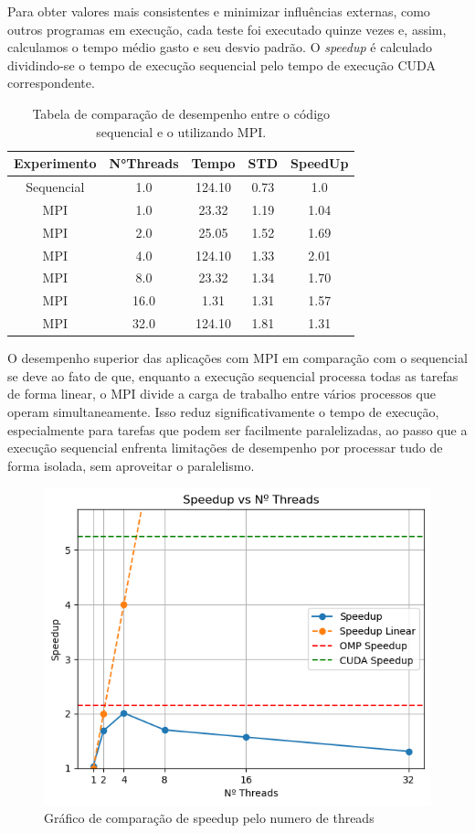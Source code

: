 \documentclass[12pt]{article}
\begin{document}
Para obter valores mais consistentes e minimizar influências externas, como
outros programas em execução, cada teste foi executado quinze vezes e, assim,
calculamos o tempo médio gasto e seu desvio padrão. O \textit{speedup} é
calculado dividindo-se o tempo de execução sequencial pelo tempo de execução
CUDA correspondente.

\begin{table}[ht]
  \centering
  \caption{Tabela de comparação de desempenho entre o código sequencial e o
    utilizando MPI.}
  \vspace{0.3cm}
  \begin{tabular}{||c c c c c||}
    \hline
    Experimento &  N°Threads          & Tempo & STD & SpeedUp \\ [0.5ex]
    \hline\hline
    Sequencial         & 1.0 & 124.10    & 0.73 & 1.0     \\
    \hline
    MPI          & 1.0  & 23.32  & 1.19 & 1.04   \\
    \hline
    MPI          & 2.0  & 25.05   & 1.52 & 1.69  \\
    \hline
    MPI         & 4.0 & 124.10    & 1.33 & 2.01     \\
    \hline
    MPI        & 8.0  & 23.32  & 1.34  & 1.70  \\
    \hline
    MPI         & 16.0  & 1.31  & 1.31 & 1.57  \\
    \hline
    MPI       & 32.0 & 124.10    & 1.81 & 1.31    \\
    \hline    
  \end{tabular}
\end{table}

O desempenho superior das aplicações com MPI em comparação com o sequencial se deve ao fato de que, enquanto a execução sequencial processa todas as tarefas de forma linear, o MPI divide a carga de trabalho entre vários processos que operam simultaneamente. Isso reduz significativamente o tempo de execução, especialmente para tarefas que podem ser facilmente paralelizadas, ao passo que a execução sequencial enfrenta limitações de desempenho por processar tudo de forma isolada, sem aproveitar o paralelismo.

\begin{figure}[H]
  \centering
  \includegraphics[width=.40\textwidth]{docs/figs/speedupxthreads- MPI.png}
  \caption{Gráfico de comparação de speedup pelo numero de threads}
  \label{fig:boxplot_cuda}
\end{figure}
\end{document}
